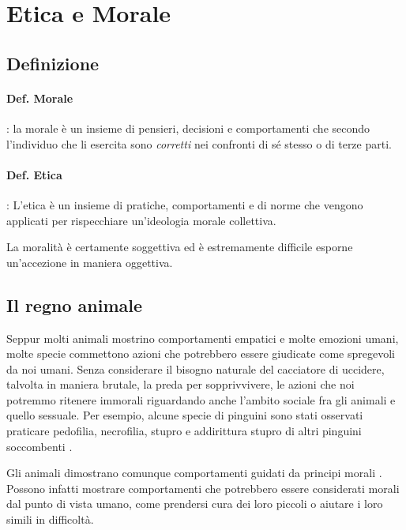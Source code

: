 \documentclass[a4paper, 12pt]{article}
\begin{document}
\pagebreak

\section{Etica e Morale}

\subsection{Definizione}

\paragraph{Def. Morale}:
la morale è un insieme di pensieri, decisioni e comportamenti che secondo l'individuo
che li esercita sono \textit{corretti} nei confronti di sé stesso o di terze parti.

\paragraph{Def. Etica}:
L'etica è un insieme di pratiche, comportamenti e di norme che vengono applicati
per rispecchiare un'ideologia morale collettiva.

La moralità è certamente soggettiva ed è estremamente
difficile esporne un'accezione in maniera oggettiva.

\subsection{Il regno animale}

Seppur molti animali mostrino comportamenti empatici e molte emozioni umani,
molte specie commettono azioni che potrebbero essere giudicate come spregevoli da noi umani.
Senza considerare il bisogno naturale del cacciatore di uccidere, talvolta in maniera brutale,
la preda per sopprivvivere, le azioni che noi potremmo ritenere immorali
riguardando anche l'ambito sociale fra gli animali e quello sessuale.
Per esempio, alcune specie di pinguini sono stati osservati praticare
pedofilia, necrofilia, stupro e addirittura stupro di altri pinguini soccombenti
\cite{penguins}.

Gli animali dimostrano comunque comportamenti guidati da principi morali
\cite{rowlands2012oxford} \cite{rowlands2015can} \cite{andrews2018routledge}.
Possono infatti mostrare comportamenti che potrebbero essere considerati morali dal punto di vista umano,
come prendersi cura dei loro piccoli o aiutare i loro simili in difficoltà.
\end{document}
